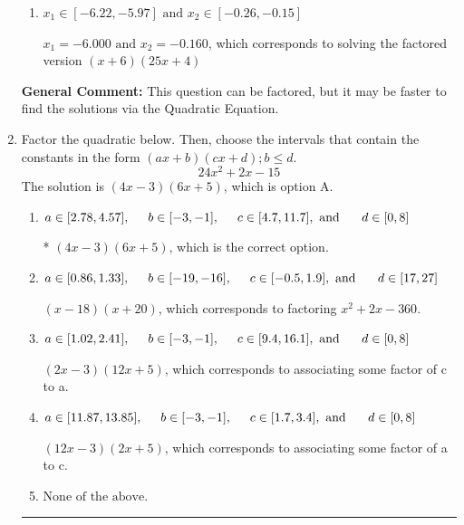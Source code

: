 \documentclass{extbook}[14pt]
\newcommand{\litem}[1]{\item #1

\rule{\textwidth}{0.4pt}}
\begin{document}
\begin{enumerate}
{\begin{enumerate}[label=\Alph*.]
$x_1 = -30.000 \text{ and } x_2 = -20.000$, which corresponds to solving the factored version $(x + 30)(x + 20)$
\item \( x_1 \in [-6.22, -5.97] \text{ and } x_2 \in [-0.26, -0.15] \)

$x_1 = -6.000 \text{ and } x_2 = -0.160$, which corresponds to solving the factored version $(x + 6)(25x + 4)$
\end{enumerate}

\textbf{General Comment:} This question can be factored, but it may be faster to find the solutions via the Quadratic Equation.
}
\litem{
Factor the quadratic below. Then, choose the intervals that contain the constants in the form $(ax+b)(cx+d); b \leq d.$
\[ 24x^{2} +2 x -15 \]The solution is \( (4x -3)(6x + 5) \), which is option A.\begin{enumerate}[label=\Alph*.]
\item \( a \in [2.78, 4.57], \hspace*{5mm} b \in [-3, -1], \hspace*{5mm} c \in [4.7, 11.7], \text{ and } \hspace*{5mm} d \in [0, 8] \)

* $(4x -3)(6x + 5)$, which is the correct option.
\item \( a \in [0.86, 1.33], \hspace*{5mm} b \in [-19, -16], \hspace*{5mm} c \in [-0.5, 1.9], \text{ and } \hspace*{5mm} d \in [17, 27] \)

 $(x -18)(x + 20)$, which corresponds to factoring $x^{2} +2 x -360$.
\item \( a \in [1.02, 2.41], \hspace*{5mm} b \in [-3, -1], \hspace*{5mm} c \in [9.4, 16.1], \text{ and } \hspace*{5mm} d \in [0, 8] \)

 $(2x -3)(12x + 5)$, which corresponds to associating some factor of c to a.
\item \( a \in [11.87, 13.85], \hspace*{5mm} b \in [-3, -1], \hspace*{5mm} c \in [1.7, 3.4], \text{ and } \hspace*{5mm} d \in [0, 8] \)

 $(12x -3)(2x + 5)$, which corresponds to associating some factor of a to c.
\item \( \text{None of the above.} \)


\end{enumerate}}
\end{enumerate}
\end{document}
